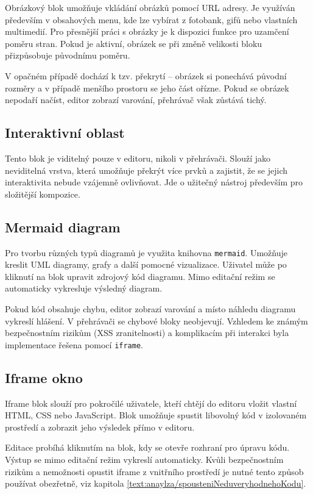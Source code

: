 Obrázkový blok umožňuje vkládání obrázků pomocí URL adresy. 
Je využíván především v obsahových menu, kde lze vybírat z fotobank, gifů nebo vlastních multimedií. 
Pro přesnější práci s obrázky je k dispozici funkce pro uzamčení poměru stran. 
Pokud je aktivní, obrázek se při změně velikosti bloku přizpůsobuje původnímu poměru. 

V opačném případě dochází k tzv. překrytí -- obrázek si ponechává původní rozměry a v případě menšího prostoru se jeho část ořízne.
Pokud se obrázek nepodaří načíst, editor zobrazí varování, přehrávač však zůstává tichý.

\subsection{Interaktivní oblast}

Tento blok je viditelný pouze v editoru, nikoli v přehrávači.
Slouží jako neviditelná vrstva, která umožňuje překrýt více prvků a zajistit, že se jejich interaktivita nebude vzájemně ovlivňovat.
Jde o užitečný nástroj především pro složitější kompozice.

\subsection{Mermaid diagram}

Pro tvorbu různých typů diagramů je využita knihovna \texttt{mermaid}. 
Umožňuje kreslit UML diagramy, grafy a další pomocné vizualizace. 
Uživatel může po kliknutí na blok upravit zdrojový kód diagramu. 
Mimo editační režim se automaticky vykresluje výsledný diagram.

Pokud kód obsahuje chybu, editor zobrazí varování a místo náhledu diagramu vykreslí hlášení.
V přehrávači se chybové bloky neobjevují. 
Vzhledem ke známým bezpečnostním rizikům (XSS zranitelnosti) a komplikacím při interakci byla implementace řešena pomocí \texttt{iframe}.

\subsection{Iframe okno}

Iframe blok slouží pro pokročilé uživatele, kteří chtějí do editoru vložit vlastní HTML, CSS nebo JavaScript. 
Blok umožňuje spustit libovolný kód v izolovaném prostředí a zobrazit jeho výsledek přímo v editoru.

Editace probíhá kliknutím na blok, kdy se otevře rozhraní pro úpravu kódu. 
Výstup se mimo editační režim vykreslí automaticky. 
Kvůli bezpečnostním rizikům a nemožnosti opustit iframe z vnitřního prostředí je nutné tento způsob používat obezřetně, viz kapitola \ref{text:anaylza/spousteniNeduveryhodnehoKodu}.

